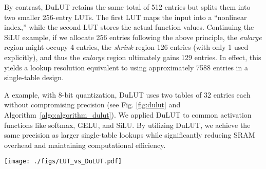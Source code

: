 By contrast, DuLUT retains the same total of 512 entries but splits them into two smaller 256-entry LUTs. The first LUT maps the input into a “nonlinear index,” while the second LUT stores the actual function values. Continuing the SiLU example, if we allocate 256 entries following the above principle, the \textit{enlarge} region might occupy 4 entries, the \textit{shrink} region 126 entries (with only 1 used explicitly), and thus the \textit{enlarge} region ultimately gains 129 entries. In effect, this yields a lookup resolution equivalent to using approximately 7588 entries in a single-table design.



A example, with 8-bit quantization, DuLUT uses two tables of 32 entries each without compromising precision (see Fig. \ref{fig:dulut} and Algorithm~\ref{algo:algorithm_dulut}). We applied DuLUT to common activation functions like softmax, GELU, and SiLU. By utilizing DuLUT, we achieve the same precision as larger single-table lookups while significantly reducing SRAM overhead and maintaining computational efficiency.

\begin{figure*}[htb]
\centering
	\texttt{[image: ./figs/LUT\_vs\_DuLUT.pdf]}
    \vspace{-0.3cm}
	\caption{Illustration for LUT and DuLUT}
	\label{fig:dulut}
    \vspace{-0.5cm}
\end{figure*}


